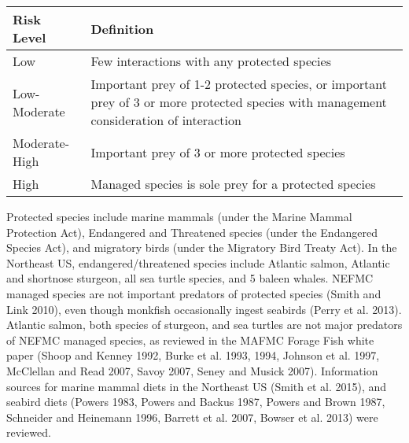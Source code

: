 \documentclass[11pt,]{article}
\begin{document}
\begin{longtable}[]{@{}ll@{}}
\toprule
\begin{minipage}[b]{0.22\columnwidth}\raggedright\strut
Risk Level\strut
\end{minipage} & \begin{minipage}[b]{0.72\columnwidth}\raggedright\strut
Definition\strut
\end{minipage}\tabularnewline
\midrule
\endhead
\begin{minipage}[t]{0.22\columnwidth}\raggedright\strut
Low\strut
\end{minipage} & \begin{minipage}[t]{0.72\columnwidth}\raggedright\strut
Few interactions with any protected species\strut
\end{minipage}\tabularnewline
\begin{minipage}[t]{0.22\columnwidth}\raggedright\strut
Low-Moderate\strut
\end{minipage} & \begin{minipage}[t]{0.72\columnwidth}\raggedright\strut
Important prey of 1-2 protected species, or important prey of 3 or more
protected species with management consideration of interaction\strut
\end{minipage}\tabularnewline
\begin{minipage}[t]{0.22\columnwidth}\raggedright\strut
Moderate-High\strut
\end{minipage} & \begin{minipage}[t]{0.72\columnwidth}\raggedright\strut
Important prey of 3 or more protected species\strut
\end{minipage}\tabularnewline
\begin{minipage}[t]{0.22\columnwidth}\raggedright\strut
High\strut
\end{minipage} & \begin{minipage}[t]{0.72\columnwidth}\raggedright\strut
Managed species is sole prey for a protected species\strut
\end{minipage}\tabularnewline
\bottomrule
\end{longtable}

Protected species include marine mammals (under the Marine Mammal
Protection Act), Endangered and Threatened species (under the Endangered
Species Act), and migratory birds (under the Migratory Bird Treaty Act).
In the Northeast US, endangered/threatened species include Atlantic
salmon, Atlantic and shortnose sturgeon, all sea turtle species, and 5
baleen whales. NEFMC managed species are not important predators of
protected species (Smith and Link 2010), even though monkfish
occasionally ingest seabirds (Perry et al. 2013). Atlantic salmon, both
species of sturgeon, and sea turtles are not major predators of NEFMC
managed species, as reviewed in the MAFMC Forage Fish white paper (Shoop
and Kenney 1992, Burke et al. 1993, 1994, Johnson et al. 1997, McClellan
and Read 2007, Savoy 2007, Seney and Musick 2007). Information sources
for marine mammal diets in the Northeast US (Smith et al. 2015), and
seabird diets (Powers 1983, Powers and Backus 1987, Powers and Brown
1987, Schneider and Heinemann 1996, Barrett et al. 2007, Bowser et al.
2013) were reviewed.
\end{document}
